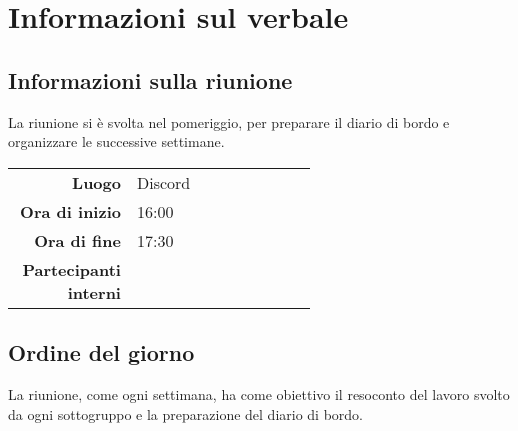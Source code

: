 \section{Informazioni sul verbale}

\subsection{Informazioni sulla riunione}
La riunione si è svolta nel pomeriggio, per preparare il diario di bordo e organizzare le successive settimane.

\begin{center}
	\begin{tabular}{r|p{0.6\linewidth}}
		\toprule
		\textbf{Luogo} & Discord \\
		\textbf{Ora di inizio} & 16:00 \\
		\textbf{Ora di fine} & 17:30 \\
		\textbf{Partecipanti interni} & \groupTeam
	\end{tabular}
\end{center}

\medskip

\subsection{Ordine del giorno}
La riunione, come ogni settimana, ha come obiettivo il resoconto del lavoro svolto da ogni sottogruppo e la preparazione del diario di bordo.

